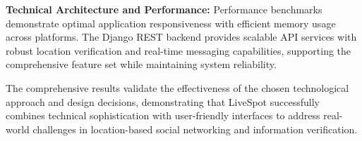 \textbf{Technical Architecture and Performance:}
Performance benchmarks demonstrate optimal application responsiveness with efficient memory usage across platforms. The Django REST backend provides scalable API services with robust location verification and real-time messaging capabilities, supporting the comprehensive feature set while maintaining system reliability.

The comprehensive results validate the effectiveness of the chosen technological approach and design decisions, demonstrating that LiveSpot successfully combines technical sophistication with user-friendly interfaces to address real-world challenges in location-based social networking and information verification.
